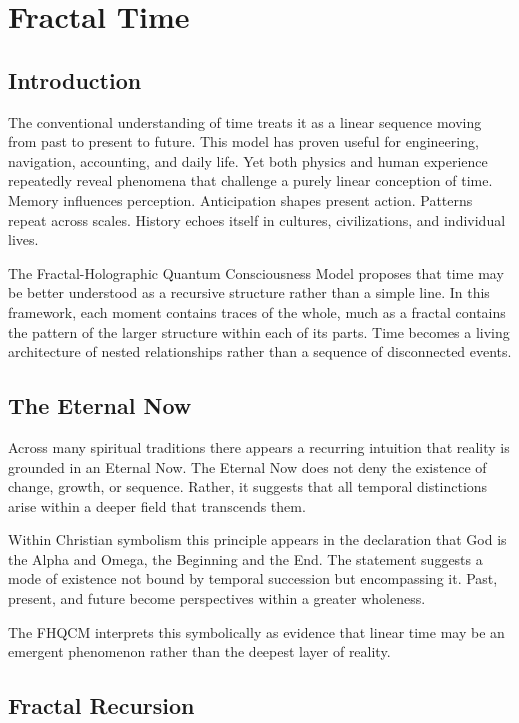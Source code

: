 \chapter{Fractal Time}

\section{Introduction}

The conventional understanding of time treats it as a linear sequence moving from past to present to future. This model has proven useful for engineering, navigation, accounting, and daily life. Yet both physics and human experience repeatedly reveal phenomena that challenge a purely linear conception of time. Memory influences perception. Anticipation shapes present action. Patterns repeat across scales. History echoes itself in cultures, civilizations, and individual lives.

The Fractal-Holographic Quantum Consciousness Model proposes that time may be better understood as a recursive structure rather than a simple line. In this framework, each moment contains traces of the whole, much as a fractal contains the pattern of the larger structure within each of its parts. Time becomes a living architecture of nested relationships rather than a sequence of disconnected events.

\section{The Eternal Now}

Across many spiritual traditions there appears a recurring intuition that reality is grounded in an Eternal Now. The Eternal Now does not deny the existence of change, growth, or sequence. Rather, it suggests that all temporal distinctions arise within a deeper field that transcends them.

Within Christian symbolism this principle appears in the declaration that God is the Alpha and Omega, the Beginning and the End. The statement suggests a mode of existence not bound by temporal succession but encompassing it. Past, present, and future become perspectives within a greater wholeness.

The FHQCM interprets this symbolically as evidence that linear time may be an emergent phenomenon rather than the deepest layer of reality.

\section{Fractal Recursion}

